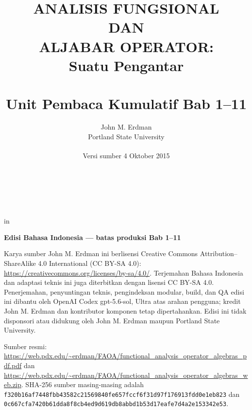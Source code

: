 \documentclass[11pt,reqno]{amsbook}
\theoremstyle{definition}
\theoremstyle{remark}
\numberwithin{equation}{section}
\begin{document}
 \frontmatter
 \title{ANALISIS FUNGSIONAL \\ DAN \\ ALJABAR OPERATOR: \\ Suatu Pengantar \\ \mbox{} \\ \large Unit Pembaca Kumulatif Bab 1--11}
 \author{John M. Erdman \\
      Portland State University \\
      \mbox{\hphantom{P}} \\
      Versi sumber 4 Oktober 2015 \\
      \mbox{\hphantom{P}} \\
      \mbox{\hphantom{P}} \\
            \mbox{\hphantom{P}} \\
                  \mbox{\hphantom{P}} }


 in


\maketitle


\begin{center}
\textbf{Edisi Bahasa Indonesia --- batas produksi Bab 1--11}
\end{center}

Karya sumber John M. Erdman ini berlisensi Creative Commons
Attribution--ShareAlike 4.0 International (CC BY-SA 4.0):
\url{https://creativecommons.org/licenses/by-sa/4.0/}.
Terjemahan Bahasa Indonesia dan adaptasi teknis ini juga diterbitkan dengan
lisensi CC BY-SA 4.0. Penerjemahan, penyuntingan teknis, pengindeksan modular,
build, dan QA edisi ini dibantu oleh OpenAI Codex gpt-5.6-sol, Ultra atas arahan
pengguna; kredit John M. Erdman dan kontributor komponen tetap dipertahankan.
Edisi ini tidak
disponsori atau didukung oleh John M. Erdman maupun Portland State University.

\begin{sloppypar}
Sumber resmi:
\url{https://web.pdx.edu/~erdman/FAOA/functional_analysis_operator_algebras_pdf.pdf}
dan
\url{https://web.pdx.edu/~erdman/FAOA/functional_analysis_operator_algebras_web.zip}.
SHA-256 sumber masing-masing adalah
\texttt{f320b16af7448fbb43582c21569840fe\allowbreak657fccf6f31d97f176913fdd0e1eb823}
dan
\texttt{0c667cfa7420b61dda8f8cb4ed9d619d\allowbreak b8abbd1b53d17eafe7d4a2e153342e53}.
\end{sloppypar}
\end{document}
